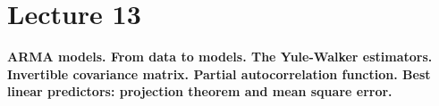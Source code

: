 \section{Lecture 13}
\label{lecture13}

\begin{center}
    \textbf{ARMA models. From data to models. The Yule-Walker estimators. Invertible covariance matrix. Partial autocorrelation function. Best linear predictors: projection theorem and mean square error.}
\end{center}
